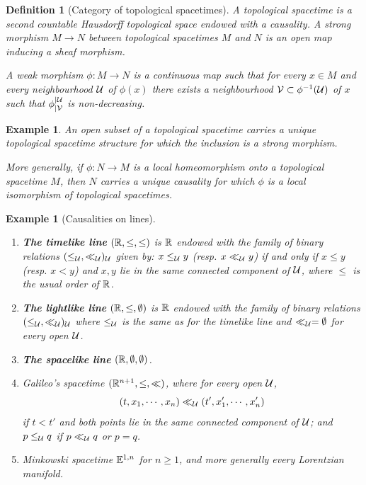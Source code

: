 \documentclass[a4paper,twoside]{article}
\newtheorem{defi}[lem]{Definition}
\newtheorem{exemple}[lem]{Example}
\begin{document}
		\begin{defi}[Category of topological spacetimes]
			A topological spacetime is a second countable Hausdorff topological space endowed with a causality. A strong morphism $M\rightarrow N$ between topological spacetimes $M$ and $N$ is an open map inducing a sheaf morphism.

			A weak morphism $\phi:M\rightarrow N$ is a continuous map such that for every $x\in M$ and every neighbourhood $\mathcal{U}$ of $\phi(x)$ there exists a neighbourhood $\mathcal V\subset \phi^{-1}(\mathcal{U})$ of $x$ such that $\phi_{|\mathcal V}^{|\mathcal{U}}$ is non-decreasing.
		\end{defi}
		\begin{exemple}\label{ex:open_subset}
		 An open subset of a topological spacetime carries a unique topological spacetime structure for which the inclusion is a strong morphism.

		 More generally, if $\phi:N\rightarrow M$ is a local homeomorphism onto a topological spacetime $M$, then $N$ carries a unique causality for which $\phi$ is a local isomorphism of topological spacetimes.
		\end{exemple}

		\begin{exemple}[Causalities on lines]
		\begin{enumerate}
			\item \textbf{The timelike line}
				$(\mathbb R,\leq,\leq)$ is $\mathbb R$ endowed with the family of binary relations $(\leq_{\mathcal{U}},\ll_{\mathcal{U}})_{\mathcal{U}}$ given by:
				$x\leq_{\mathcal{U}} y$ (resp. $x\ll_{\mathcal{U}} y$) if and only if $x\leq y$ (resp. $x< y$) and $x,y$ lie in the same connected component of $\mathcal{U}$, where $\leq$ is the usual order of $\mathbb R$.
			\item
				\textbf{The lightlike line} $(\mathbb R,\leq,\emptyset)$ is $\mathbb R$ endowed with the family of binary relations $(\leq_{\mathcal{U}},\ll_{\mathcal{U}})_{\mathcal{U}}$ where $\leq_{\mathcal{U}}$ is the same as for the timelike line and $\ll_{\mathcal{U}}=\emptyset$ for every open $\mathcal{U}$.
			\item \textbf{The spacelike line} $(\mathbb R,\emptyset,\emptyset)$.
			\item Galileo's spacetime $(\mathbb R^{n+1},\leq,\ll)$, where for every open $\mathcal{U}$,
				$$(t,x_1,\cdots,x_n)\ll_{\mathcal{U}}  (t',x_1',\cdots,x_n')$$ if $t<t'$ and both points lie in the same connected component of $\mathcal{U}$; and $p\leq_{\mathcal{U}} q$ if $p\ll_{\mathcal{U}} q$ or $p=q$.
			\item
				Minkowski spacetime $\mathbb{E}^{1,n}$ for $n\geq1$, and more generally every Lorentzian manifold.
		\end{enumerate}
		\end{exemple}
\end{document}
